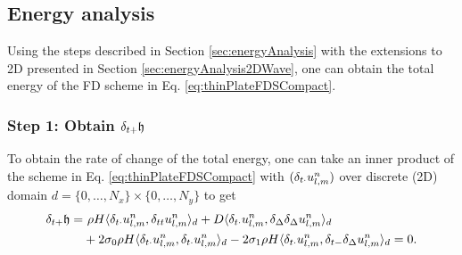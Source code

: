 {\subsection{Energy analysis}\label{sec:energyAnalysisThinPlate}
Using the steps described in Section \ref{sec:energyAnalysis} with the extensions to 2D presented in Section \ref{sec:energyAnalysis2DWave}, one can obtain the total energy of the FD scheme in Eq. \eqref{eq:thinPlateFDSCompact}.
\subsubsection{Step 1: Obtain $\delta_{t+} \mathfrak{h}$}
To obtain the rate of change of the total energy, one can take an inner product of the scheme in Eq. \eqref{eq:thinPlateFDSCompact} with $(\delta_{t\cdot} u_{l,m}^n)$ over discrete (2D) domain $d = \{0, \hdots, N_x\}\times \{0, \hdots, N_y\}$ to get
\begin{equation}\label{eq:rOCthinPlate}
    \begin{aligned}
        \delta_{t+} \mathfrak{h} =&\ \rho H \langle \delta_{t\cdot} u_{l,m}^n, \delta_{tt} u_{l,m}^n \rangle_d + D \langle \delta_{t\cdot} u_{l,m}^n, \delta_{\Delta}\delta_{\Delta} u_{l,m}^n \rangle_d\\
        & + 2\sigma_{0}\rho H\langle \delta_{t\cdot} u_{l,m}^n, \delta_{t\cdot} u_{l,m}^n \rangle_d - 2\sigma_{1} \rho H\langle \delta_{t\cdot} u_{l,m}^n, \delta_{t-} \delta_{\Delta} u_{l,m}^n \rangle_d = 0.
    \end{aligned}
\end{equation}

}
